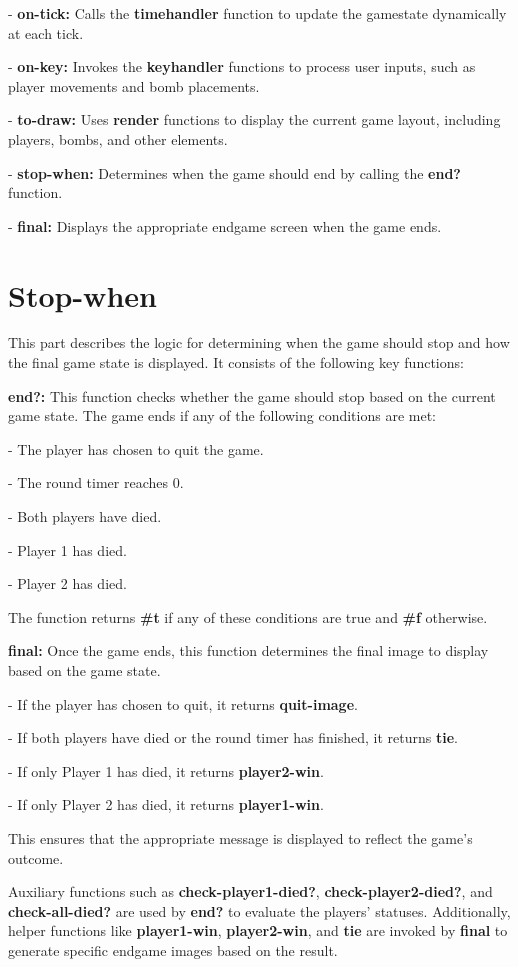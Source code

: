 \documentclass[12pt]{article}
\begin{document}
- \textbf{on-tick:} Calls the \textbf{timehandler} function to update the gamestate dynamically at each tick.

- \textbf{on-key:} Invokes the \textbf{keyhandler} functions to process user inputs, such as player movements and bomb placements.

- \textbf{to-draw:} Uses \textbf{render} functions to display the current game layout, including players, bombs, and other elements.

- \textbf{stop-when:} Determines when the game should end by calling the \textbf{end?} function.

- \textbf{final:} Displays the appropriate endgame screen when the game ends.

\section{Stop-when}
\hspace{1.27cm}This part describes the logic for determining when the game should stop and how the final game state is displayed. It consists of the following key functions:

\textbf{end?:} This function checks whether the game should stop based on the current game state. The game ends if any of the following conditions are met:

- The player has chosen to quit the game.

- The round timer reaches 0.

- Both players have died.

- Player 1 has died.

- Player 2 has died.

The function returns \textbf{\#t} if any of these conditions are true and \textbf{\#f} otherwise.

\textbf{final:} Once the game ends, this function determines the final image to display based on the game state. 

- If the player has chosen to quit, it returns \textbf{quit-image}.

- If both players have died or the round timer has finished, it returns \textbf{tie}.

- If only Player 1 has died, it returns \textbf{player2-win}.

- If only Player 2 has died, it returns \textbf{player1-win}.

This ensures that the appropriate message is displayed to reflect the game's outcome.

Auxiliary functions such as \textbf{check-player1-died?}, \textbf{check-player2-died?}, and \textbf{check-all-died?} are used by \textbf{end?} to evaluate the players' statuses. Additionally, helper functions like \textbf{player1-win}, \textbf{player2-win}, and \textbf{tie} are invoked by \textbf{final} to generate specific endgame images based on the result.
\end{document}
